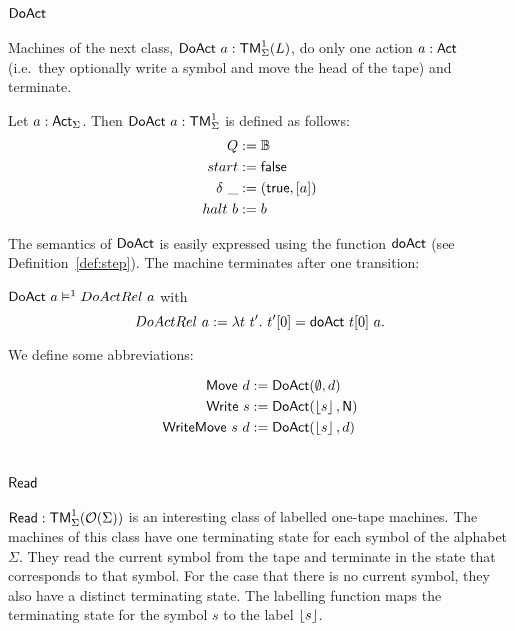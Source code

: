 \section{$\mathsf{DoAct}$}
\label{sec:DoAct}


Machines of the next class, $\mathsf{DoAct}~a : \mathsf{TM}_\Sigma^1(L)$, do only one action $a:\mathsf{Act}$ (i.e.\ they optionally write a symbol and move the head of
the tape) and terminate.
\begin{definition}[$\MS{DoAct}~a$][DoAct]
  \label{def:DoAct}
  Let $a:\mathsf{Act}_\Sigma$.  Then $\mathsf{DoAct}~a : \mathsf{TM}_\Sigma^1$ is defined as follows:
  \begin{align*}
    Q          &:= \mathbb{B} \\
    start      &:= \mathsf{false} \\
    \delta ~\_ &:= (\mathsf{true}, \left[ a \right]) \\
    halt   ~ b &:= b
  \end{align*}
\end{definition}
The semantics of $\mathsf{DoAct}$ is easily expressed using the function $\mathsf{doAct}$ (see Definition~\ref{def:step}).  The machine terminates after one
transition:
\begin{lemma}
  \label{lem:DoAct_Sem} $\mathsf{DoAct}~a \mathrel{\vDash^{1}} DoActRel~a$ with
  \[
    DoActRel~a := \lambda t~t'.~ t'[0] = \mathsf{doAct}~t[0]~a.
  \]
\end{lemma}
We define some abbreviations:
\begin{definition}
 \label{def:DoAct-derived} 
 \begin{align*}
   \mathsf{Move}       ~d &:= \mathsf{DoAct} (\emptyset, d) \\
   \mathsf{Write}    ~s   &:= \mathsf{DoAct} (\left\lfloor {s} \right\rfloor, \mathsf{N}) \\
   \mathsf{WriteMove}~s~d &:= \mathsf{DoAct} (\left\lfloor {s} \right\rfloor, d)
 \end{align*}
\end{definition}


\section{$\mathsf{Read}$}
\label{sec:basic_machines-Read}

$\mathsf{Read} : \mathsf{TM}_\Sigma^1(\mathcal{O}(\Sigma))$ is an interesting class of labelled one-tape machines.  The machines of this class have one terminating
state for each symbol of the alphabet $\Sigma$.  They read the current symbol from the tape and terminate in the state that corresponds to that
symbol.  For the case that there is no current symbol, they also have a distinct terminating state.  The labelling function maps the terminating state
for the symbol $s$ to the label $\left\lfloor {s} \right\rfloor$.

